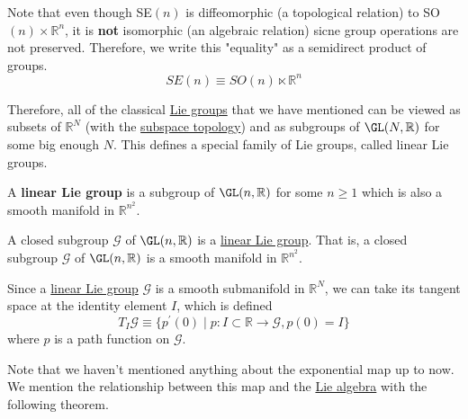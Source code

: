   Note that even though SE$(n)$ is diffeomorphic (a topological relation) to SO$(n) \times \mathbb{R}^n$, it is \textbf{not} isomorphic (an algebraic relation) sicne group operations are not preserved. Therefore, we write this "equality" as a semidirect product of groups. 
  \begin{equation}
    SE(n) \equiv SO(n) \ltimes \mathbb{R}^n
  \end{equation}

  Therefore, all of the classical \hyperref[def:lie-group]{Lie groups} that we have mentioned can be viewed as subsets of $\mathbb{R}^N$ (with the \hyperref[pst-def:subspace-topology]{subspace topology}) and as subgroups of $\GL(N, \mathbb{R})$ for some big enough $N$. This defines a special family of Lie groups, called linear Lie groups. 

  \begin{definition}
    \label{def:linear-lie-group}
    A \textbf{linear Lie group} is a subgroup of $\GL(n, \mathbb{R})$ for some $n \geq 1$ which is also a smooth manifold in $\mathbb{R}^{n^2}$. 
  \end{definition}

  \begin{theorem}
    \label{thm:von-neumann-cartan}
    A closed subgroup $\mathcal{G}$ of $\GL(n, \mathbb{R})$ is a \hyperref[def:linear-lie-group]{linear Lie group}. That is, a closed subgroup $\mathcal{G}$ of $\GL(n, \mathbb{R})$ is a smooth manifold in $\mathbb{R}^{n^2}$.
  \end{theorem}

  \begin{definition}
    \label{def:tangent-space-at-the-identity}
    Since a \hyperref[def:linear-lie-group]{linear Lie group} $\mathcal{G}$ is a smooth submanifold in $\mathbb{R}^N$, we can take its tangent space at the identity element $I$, which is defined 
    \begin{equation}
      T_I \mathcal{G} \equiv \{p^\prime (0) \;|\; p: I \subset \mathbb{R} \rightarrow \mathcal{G}, p(0) = I\}
    \end{equation}
    where $p$ is a path function on $\mathcal{G}$. 
  \end{definition}

  Note that we haven't mentioned anything about the exponential map up to now. We mention the relationship between this map and the \hyperref[def:lie-algebra]{Lie algebra} with the following theorem. 

